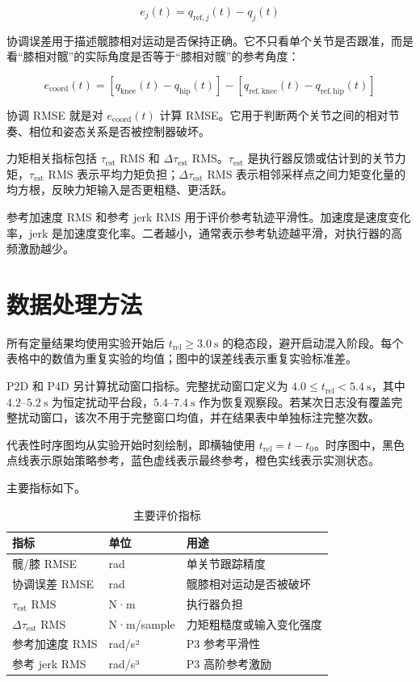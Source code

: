 \documentclass[12pt,a4paper]{ctexart}
\begin{document}
\[
e_j(t)=q_{\mathrm{ref},j}(t)-q_j(t)
\]

协调误差用于描述髋膝相对运动是否保持正确。它不只看单个关节是否跟准，而是看“膝相对髋”的实际角度是否等于“膝相对髋”的参考角度：

\[
e_{\mathrm{coord}}(t)=
\left[q_{\mathrm{knee}}(t)-q_{\mathrm{hip}}(t)\right]
-
\left[q_{\mathrm{ref},\mathrm{knee}}(t)-q_{\mathrm{ref},\mathrm{hip}}(t)\right]
\]

协调 RMSE 就是对 $e_{\mathrm{coord}}(t)$ 计算 RMSE。它用于判断两个关节之间的相对节奏、相位和姿态关系是否被控制器破坏。

力矩相关指标包括 $\tau_\mathrm{est}$ RMS 和 $\Delta \tau_\mathrm{est}$ RMS。$\tau_\mathrm{est}$ 是执行器反馈或估计到的关节力矩，$\tau_\mathrm{est}$ RMS 表示平均力矩负担；$\Delta \tau_\mathrm{est}$ RMS 表示相邻采样点之间力矩变化量的均方根，反映力矩输入是否更粗糙、更活跃。

参考加速度 RMS 和参考 jerk RMS 用于评价参考轨迹平滑性。加速度是速度变化率，jerk 是加速度变化率。二者越小，通常表示参考轨迹越平滑，对执行器的高频激励越少。

\section{数据处理方法}


所有定量结果均使用实验开始后 $t_\mathrm{rel}\ge 3.0\ \mathrm{s}$ 的稳态段，避开启动混入阶段。每个表格中的数值为重复实验的均值；图中的误差线表示重复实验标准差。

P2D 和 P4D 另计算扰动窗口指标。完整扰动窗口定义为 $4.0\le t_\mathrm{rel}<5.4\ \mathrm{s}$，其中 $4.2$--$5.2\ \mathrm{s}$ 为恒定扰动平台段，$5.4$--$7.4\ \mathrm{s}$ 作为恢复观察段。若某次日志没有覆盖完整扰动窗口，该次不用于完整窗口均值，并在结果表中单独标注完整次数。

代表性时序图均从实验开始时刻绘制，即横轴使用 $t_\mathrm{rel}=t-t_0$。时序图中，黑色点线表示原始策略参考，蓝色虚线表示最终参考，橙色实线表示实测状态。

主要指标如下。

\begin{table}[htbp]
\centering
\footnotesize
\caption{主要评价指标}
\begin{tabularx}{\textwidth}{YYY}
\toprule
指标 & 单位 & 用途 \\
\midrule
髋/膝 RMSE & rad & 单关节跟踪精度 \\
协调误差 RMSE & rad & 髋膝相对运动是否被破坏 \\
$\tau_\mathrm{est}$ RMS & N·m & 执行器负担 \\
$\Delta \tau_\mathrm{est}$ RMS & N·m/sample & 力矩粗糙度或输入变化强度 \\
参考加速度 RMS & rad/s² & P3 参考平滑性 \\
参考 jerk RMS & rad/s³ & P3 高阶参考激励 \\
\bottomrule
\end{tabularx}
\end{table}
\end{document}
